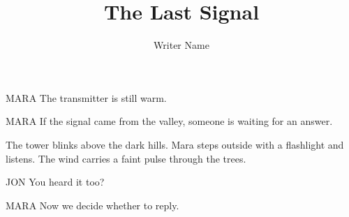 \documentclass{screenplay}
\title{The Last Signal}
\author{Writer Name}
\begin{document}
\coverpage
{}
\begin{dialogue}{MARA}
The transmitter is still warm.
\end{dialogue}
\begin{dialogue}[quietly]{MARA}
If the signal came from the valley, someone is waiting for an answer.
\end{dialogue}
The tower blinks above the dark hills. Mara steps outside with a flashlight
and listens. The wind carries a faint pulse through the trees.
\begin{dialogue}{JON}
You heard it too?
\end{dialogue}
\begin{dialogue}{MARA}
Now we decide whether to reply.
\end{dialogue}
\end{document}
